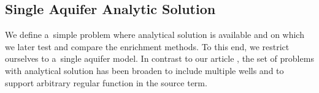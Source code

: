 
\subsection{Single Aquifer Analytic Solution} \label{sec:prim_analytic_solution}
We define a~simple problem where analytical solution is available and 
on which we later test and compare the enrichment methods.
To this end, we restrict ourselves to a~single aquifer model.
In contrast to our article \cite{exner_2016}, the set of problems with analytical solution 
has been broaden to include multiple wells and to support arbitrary regular function in the source term.

